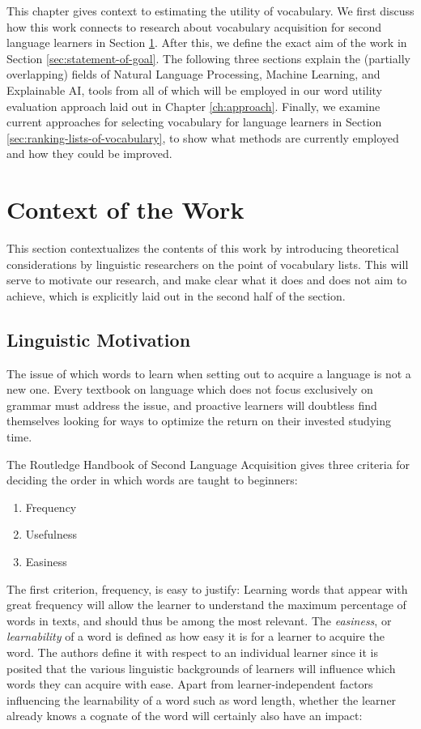 This chapter gives context to estimating the utility of vocabulary.
We first discuss how this work connects to research about vocabulary acquisition for second language learners in Section \ref{sec:context-of-work}.
After this, we define the exact aim of the work in Section \ref{sec:statement-of-goal}.
The following three sections explain the (partially overlapping) fields of Natural Language Processing, Machine Learning, and Explainable AI, tools from all of which will be employed in our word utility evaluation approach laid out in Chapter \ref{ch:approach}.
Finally, we examine current approaches for selecting vocabulary for language learners in Section \ref{sec:ranking-lists-of-vocabulary}, to show what methods are currently employed and how they could be improved.


\section{Context of the Work} \label{sec:context-of-work}

This section contextualizes the contents of this work by introducing theoretical considerations by linguistic researchers on the point of vocabulary lists.
This will serve to motivate our research, and make clear what it does and does not aim to achieve, which is explicitly laid out in the second half of the section.

\subsection{Linguistic Motivation} \label{sec:linguistic-motivation}
The issue of which words to learn when setting out to acquire a language is not a new one.
Every textbook on language which does not focus exclusively on grammar must address the issue, and proactive learners will doubtless find themselves looking for ways to optimize the return on their invested studying time.

The Routledge Handbook of Second Language Acquisition \cite{liRoutledgeHandbookSecond2022} gives three criteria for deciding the order in which words are taught to beginners:

\begin{enumerate}
	\item Frequency
	\item Usefulness
	\item Easiness
\end{enumerate}

The first criterion, frequency, is easy to justify:
Learning words that appear with great frequency will allow the learner to understand the maximum percentage of words in texts, and should thus be among the most relevant.
The \textit{easiness}, or \textit{learnability} of a word is defined as how easy it is for a learner to acquire the word.
The authors define it with respect to an individual learner since it is posited that the various linguistic backgrounds of learners will influence which words they can acquire with ease.
Apart from learner-independent factors influencing the learnability of a word such as word length, whether the learner already knows a cognate of the word will certainly also have an impact:

